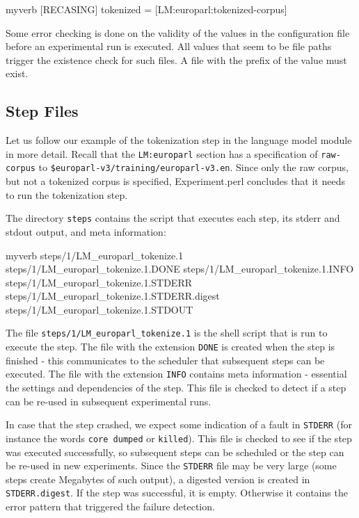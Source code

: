 \documentclass{pbml}
\begin{document}
\vspace{2mm}
\begin{SaveVerbatim}{myverb}
 [RECASING]
 tokenized = [LM:europarl:tokenized-corpus]
\end{SaveVerbatim}
\colorbox{gray}{%
}
\vspace{2mm}

Some error checking is done on the validity of the values in the configuration file before an experimental run is executed. All values that seem to be file paths trigger the existence check for such files. A file with the prefix of the value must exist.

\subsection{Step Files}
Let us follow our example of the tokenization step in the language model module in more detail. Recall that the {\tt LM:europarl} section has a specification of {\tt raw-corpus} to {\tt \$europarl-v3/train\-ing/europarl-v3.en}. Since only the raw corpus, but not a tokenized corpus is specified, Experiment.perl concludes that it needs to run the tokenization step.

The directory {\tt steps} contains the script that executes each step, its {\sc stderr} and {\sc stdout} output, and meta information:

\vspace{2mm}
\begin{SaveVerbatim}{myverb}
 steps/1/LM_europarl_tokenize.1
 steps/1/LM_europarl_tokenize.1.DONE
 steps/1/LM_europarl_tokenize.1.INFO
 steps/1/LM_europarl_tokenize.1.STDERR 
 steps/1/LM_europarl_tokenize.1.STDERR.digest
 steps/1/LM_europarl_tokenize.1.STDOUT
\end{SaveVerbatim}
\colorbox{gray}{%
}
\vspace{2mm}

The file {\tt steps/1/LM\_europarl\_tokenize.1} is the shell script that is run to execute the step. The file with the extension {\tt DONE} is created when the step is finished - this communicates to the scheduler that subsequent steps can be executed. The file with the extension {\tt INFO} contains meta information - essential the settings and dependencies of the step. This file is checked to detect if a step can be re-used in subsequent experimental runs.

In case that the step crashed, we expect some indication of a fault in {\tt STDERR} (for instance the words {\tt core dumped} or {\tt killed}). This file is checked to see if the step was executed successfully, so subsequent steps can be scheduled or the step can be re-used in new experiments. Since the {\tt STDERR} file may be very large (some steps create Megabytes of such output), a digested version is created in {\tt STDERR.digest}. If the step was successful, it is empty. Otherwise it contains the error pattern that triggered the failure detection.
\end{document}
